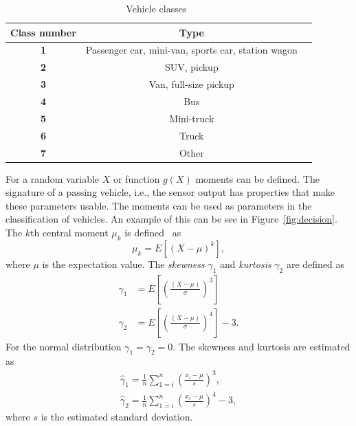 \begin{table}[htbf]
 \centering
 \caption[Vehicle classes]{Vehicle classes~\cite{sun2000}}
 \label{tbl:classes}
 \begin{tabular}{ccl}\toprule
 \textbf{Class number} & \textbf{Type}\\ \midrule
 \textbf{1} & Passenger car, mini-van, sports car, station wagon\\
 \textbf{2} & SUV, pickup\\
 \textbf{3} & Van, full-size pickup\\
 \textbf{4} & Bus\\ 
 \textbf{5} & Mini-truck\\
 \textbf{6} & Truck\\
 \textbf{7} & Other\\\bottomrule
 \end{tabular}
\end{table}


For a random variable $X$ or function $g(X)$ moments can be defined. The signature of a passing vehicle, i.e., the sensor output has properties that make these parameters usable. The moments can be used as parameters in the classification of vehicles. An example of this can be see in \mbox{Figure~\ref{fig:decision}}. The $k$th central moment $\mu_k$ is defined~\cite{Raade:1995:MHS} as
\begin{equation}
\mu_k = E[(X-\mu)^k],
\end{equation}
where $\mu$ is the expectation value. The \emph{skewness} $\gamma_1$ and \emph{kurtosis} $\gamma_2$ are defined as
\begin{align}
 	\gamma_1 &= E\left[\left(\frac{(X-\mu)}{\sigma}\right)^3\right]\\
 	\gamma_2 &= E\left[\left(\frac{(X-\mu)}{\sigma}\right)^4\right]-3.
\end{align}
For the normal distribution $\gamma_1 = \gamma_2 = 0$. The skewness and kurtosis are estimated as
\begin{align}
 \hat{\gamma}_1 = \frac{1}{n}\sum_{1=i}^n\left(\frac{x_i-\mu}{s}\right)^3,\\
 \hat{\gamma}_2 = \frac{1}{n}\sum_{1=i}^n\left(\frac{x_i-\mu}{s}\right)^4-3,
\end{align}
where $s$ is the estimated standard deviation.

